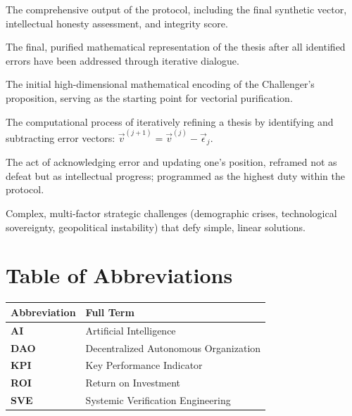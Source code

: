 \documentclass[11pt,a4paper]{article}
\begin{document}
\begin{description}[style=nextline, leftmargin=0pt, labelindent=0pt, font=\normalfont\bfseries]
    \item[Synthetic Report] The comprehensive output of the protocol, including the final synthetic vector, intellectual honesty assessment, and integrity score.
    
    \item[Synthetic Vector ($\vec{v}_{\text{synthetic}}$)] The final, purified mathematical representation of the thesis after all identified errors have been addressed through iterative dialogue.
    
    \item[Thesis Vector ($\vec{v}_{\text{thesis}}$)] The initial high-dimensional mathematical encoding of the Challenger's proposition, serving as the starting point for vectorial purification.
    
    \item[Vectorial Purification] The computational process of iteratively refining a thesis by identifying and subtracting error vectors: $\vec{v}^{(j+1)} = \vec{v}^{(j)} - \vec{\epsilon}_j$.
    
    \item[Virtuous Concession] The act of acknowledging error and updating one's position, reframed not as defeat but as intellectual progress; programmed as the highest duty within the protocol.
    
    \item[Wicked Problems] Complex, multi-factor strategic challenges (demographic crises, technological sovereignty, geopolitical instability) that defy simple, linear solutions.
\end{description}

\section*{Table of Abbreviations}

\begin{tabular}{@{}>{\bfseries}ll@{}}
\toprule
\normalfont\textbf{Abbreviation} & \textbf{Full Term} \\
\midrule
AI & Artificial Intelligence \\
DAO & Decentralized Autonomous Organization \\
KPI & Key Performance Indicator \\
ROI & Return on Investment \\
SVE & Systemic Verification Engineering \\
\bottomrule
\end{tabular}
\end{document}
